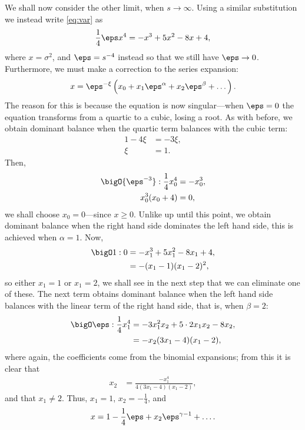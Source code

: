 We shall now consider the other limit, when $s \rightarrow \infty$. Using a similar substitution we instead write \eqref{eq:var} as
\begin{align*}
\frac{1}{4} \eps x^4 = -x^3 + 5x^2 - 8x + 4,
\end{align*}
where $x = \sigma^2$, and $\eps = s^{-4}$ instead so that we still have $\eps \rightarrow 0$. Furthermore, we must make a correction to the series expansion:
\begin{align*}
x = \eps^{-\xi} \left( x_0 + x_1 \eps^\alpha + x_2 \eps^\beta + \dots \right).
\end{align*}
The reason for this is because the equation is now singular---when $\eps=0$ the equation transforms from a quartic to a cubic, losing a root. As with before, we obtain dominant balance when the quartic term balances with the cubic term:
\begin{align*}
1 - 4 \xi &= -3 \xi, \\
\xi &= 1.
\end{align*}
Then,
\begin{align*}
\bigO{\eps^{-3}}: \frac{1}{4} x_0^4 &= -x_0^3, \\
x_0^3 (x_0 + 4) &= 0,
\end{align*}
we shall choose $x_0 = 0$---since $x \geq 0$. Unlike up until this point, we obtain dominant balance when the right hand side dominates the left hand side, this is achieved when $\alpha = 1$. Now,
\begin{align*}
\bigO1 : 0 &= -x_1^3 + 5x_1^2 - 8x_1 + 4, \\
&= -(x_1 - 1)(x_1 - 2)^2,
\end{align*}
so either $x_1 = 1$ or $x_1 = 2$, we shall see in the next step that we can eliminate one of these. The next term obtains dominant balance when the left hand side balances with the linear term of the right hand side, that is, when $\beta = 2$:
\begin{align*}
\bigO\eps : \frac{1}{4} x_1^4 &= -3x_1^2 x_2 + 5\cdot2 x_1 x_2 - 8x_2, \\
&= -x_2 (3x_1 - 4)(x_1 - 2),
\end{align*}
where again, the coefficients come from the binomial expansions;
from this it is clear that
\begin{align*}
x_2 &= \frac{-x_1^4}{4(3x_1 - 4)(x_1 - 2)},
\end{align*}
and that $x_1 \ne 2$. Thus, $x_1 = 1$, $x_2 = -\frac{1}{4}$, and
\begin{align*}
x = 1 - \frac{1}{4} \eps + x_2 \eps^{\gamma - 1} + \dots.
\end{align*}
